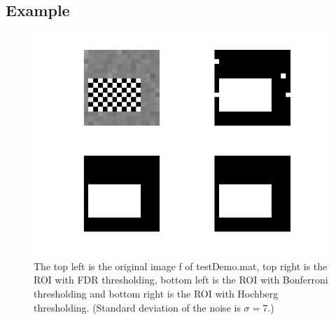 \documentclass[a4paper,12pt]{article}
\theoremstyle{plain}
\theoremstyle{definition}
\theoremstyle{remark}
\begin{document}
\newpage

\subsection{Example}
\begin{figure}[h]
	\includegraphics[width=\linewidth]{Thresholding_Comparison}
	\caption[Comparison of different thresholding procedures]{The top left is the original image f of testDemo.mat, top right is the ROI with FDR thresholding, bottom left is the ROI with Bonferroni thresholding and bottom right is the ROI with Hochberg thresholding. (Standard deviation of the noise is $\sigma = 7$.)}
	\label{fig:demo1comparison}
\end{figure}
\end{document}
